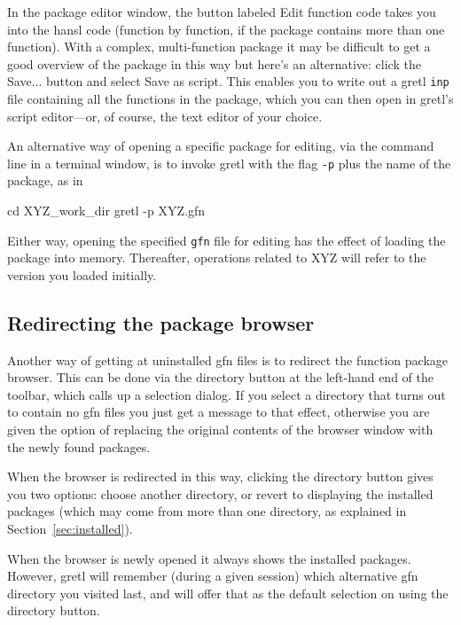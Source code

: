 \documentclass[oneside]{book}
\begin{document}
In the package editor window, the button labeled \textsf{Edit function
  code} takes you into the hansl code (function by function, if the
package contains more than one function). With a complex,
multi-function package it may be difficult to get a good overview of
the package in this way but here's an alternative: click the
\textsf{Save...} button and select \textsf{Save as script}. This
enables you to write out a gretl \texttt{inp} file containing all the
functions in the package, which you can then open in gretl's script
editor---or, of course, the text editor of your choice.

An alternative way of opening a specific package for editing, via the
command line in a terminal window, is to invoke gretl with the flag
\texttt{-p} plus the name of the package, as in
%
\begin{code}
cd XYZ_work_dir
gretl -p XYZ.gfn
\end{code}
%
Either way, opening the specified \texttt{gfn} file for editing has
the effect of loading the package into memory. Thereafter, operations
related to \textsf{XYZ} will refer to the version you loaded
initially.

\subsection{Redirecting the package browser}

Another way of getting at uninstalled \textsf{gfn} files is to
redirect the function package browser. This can be done via the
directory button at the left-hand end of the toolbar, which calls up a
selection dialog. If you select a directory that turns out to contain
no \textsf{gfn} files you just get a message to that effect, otherwise
you are given the option of replacing the original contents of the
browser window with the newly found packages.

When the browser is redirected in this way, clicking the directory
button gives you two options: choose another directory, or revert to
displaying the installed packages (which may come from more than one
directory, as explained in Section~\ref{sec:installed}).

When the browser is newly opened it always shows the installed
packages. However, gretl will remember (during a given session) which
alternative \textsf{gfn} directory you visited last, and will offer
that as the default selection on using the directory button.

\end{document}
